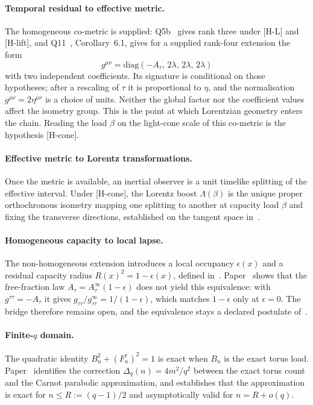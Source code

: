 \documentclass[12pt,a4paper]{article}
\theoremstyle{remark}
\begin{document}
    \paragraph{Temporal residual to effective metric.}
      The homogeneous co-metric is supplied: Q5b~\cite{Beau2026q5b} gives rank three under [H-L] and [H-lift],
      and Q11~\cite{Beau2026q11}, Corollary~6.1, gives for a supplied rank-four extension the form
      \[
        g^{\mu\nu} = \mathrm{diag}(-A_\tau,\, 2\lambda,\, 2\lambda,\, 2\lambda)
      \]
      with two independent coefficients.
      Its signature is conditional on those hypotheses; after a rescaling of $\tau$ it is proportional to $\eta$,
      and the normalisation $g^{\mu\nu} = 2\eta^{\mu\nu}$ is a choice of units.
      Neither the global factor nor the coefficient values affect the isometry group.
      This is the point at which Lorentzian geometry enters the chain.
      Reading the load $\beta$ on the light-cone scale of this co-metric is the hypothesis [H-cone].

    \paragraph{Effective metric to Lorentz transformations.}
      Once the metric is available, an inertial observer is a unit timelike splitting of the
      effective interval.
      Under [H-cone], the Lorentz boost $\Lambda(\beta)$ is the unique proper orthochronous isometry mapping one
      splitting to another at capacity load $\beta$ and fixing the transverse directions, established on the tangent
      space in~\cite{Beau2026lco1}.

    \paragraph{Homogeneous capacity to local lapse.}
      The non-homogeneous extension introduces a local occupancy $\epsilon(x)$ and a residual
      capacity radius $R(x)^2 = 1-\epsilon(x)$, defined in~\cite{Beau2026lco2}.
      Paper~\cite{Beau2026lco2o1} shows that the free-fraction law
      $A_\tau = A_\tau^\infty(1-\epsilon)$ does not yield this equivalence: with
      $g^{\tau\tau} = -A_\tau$ it gives $g_{\tau\tau}/g_{\tau\tau}^\infty = 1/(1-\epsilon)$,
      which matches $1-\epsilon$ only at $\epsilon = 0$.
      The bridge therefore remains open, and the equivalence stays a declared postulate
      of~\cite{Beau2026lco2}.

    \paragraph{Finite-$q$ domain.}
      The quadratic identity $B_n^2 + (F_n^\tau)^2 = 1$ is exact when $B_n$ is the exact torus
      load.
      Paper~\cite{Beau2026lco3} identifies the correction $\Delta_q(n) = 4m^2/q^2$ between the
      exact torus count and the Carnot parabolic approximation, and establishes that the approximation is exact for
      $n \leq R := (q-1)/2$ and asymptotically valid for $n = R + o(q)$.
\end{document}

